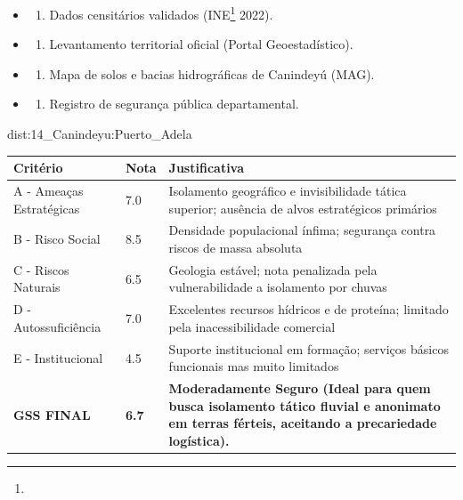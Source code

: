 {\begin{itemize}
\tightlist
\item
  \begin{enumerate}
  \def\labelenumi{\arabic{enumi})}
  \tightlist
  \item
    Dados censitários validados (INE\footnote{\fineINE} 2022).
  \end{enumerate}
\item
  \begin{enumerate}
  \def\labelenumi{\arabic{enumi})}
  \setcounter{enumi}{1}
  \tightlist
  \item
    Levantamento territorial oficial (Portal Geoestadístico).
  \end{enumerate}
\item
  \begin{enumerate}
  \def\labelenumi{\arabic{enumi})}
  \setcounter{enumi}{2}
  \tightlist
  \item
    Mapa de solos e bacias hidrográficas de Canindeyú (MAG).
  \end{enumerate}
\item
  \begin{enumerate}
  \def\labelenumi{\arabic{enumi})}
  \setcounter{enumi}{3}
  \tightlist
  \item
    Registro de segurança pública departamental.
  \end{enumerate}
\end{itemize}}{dist:14_Canindeyu:Puerto_Adela}
\begin{table}[ht!]
\small \begin{tabular}{p{3.0cm}p{0.8cm}p{6.0cm}} \toprule
\textbf{Critério} & \textbf{Nota} & \textbf{Justificativa} \\ \midrule
A - Ameaças Estratégicas & 7.0 & Isolamento geográfico e invisibilidade tática superior; ausência de alvos estratégicos primários \\
B - Risco Social & 8.5 & Densidade populacional ínfima; segurança contra riscos de massa absoluta \\
C - Riscos Naturais & 6.5 & Geologia estável; nota penalizada pela vulnerabilidade a isolamento por chuvas \\
D - Autossuficiência & 7.0 & Excelentes recursos hídricos e de proteína; limitado pela inacessibilidade comercial \\
E - Institucional & 4.5 & Suporte institucional em formação; serviços básicos funcionais mas muito limitados \\
\midrule \textbf{GSS FINAL} & \textbf{6.7} & \textbf{Moderadamente Seguro (Ideal para quem busca isolamento tático fluvial e anonimato em terras férteis, aceitando a precariedade logística).} \\ \bottomrule \end{tabular}
\end{table}
